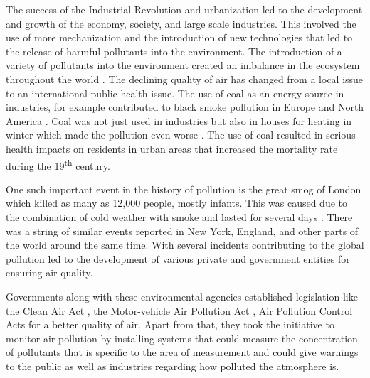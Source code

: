  The success of the Industrial Revolution and urbanization led to the development and growth of the economy, society, and large scale industries. This involved the use of more mechanization and the introduction of new technologies that led to the release of harmful pollutants into the environment. The introduction of a variety of pollutants into the environment created an imbalance in the ecosystem throughout the world \cite{manisalidis2020environmental}. The declining quality of air has changed from a local issue to an international public health issue. The use of coal as an energy source in industries, for example contributed to black smoke pollution in Europe and North America \cite{heidorn1978chronology}. Coal was not just used in industries but also in houses for heating in winter which made the pollution even worse \cite{Al2016}. The use of coal resulted in serious health impacts on residents in urban areas that increased the mortality rate during the 19\textsuperscript{th} century. 
 \par
 One such important event in the history of pollution is the great smog of London which killed as many as 12,000 people, mostly infants. This was caused due to the combination of cold weather with smoke and lasted for several days \cite{wilkins1954air}. There was a string of similar events reported in New York, England, and other parts of the world around the same time. With several incidents contributing to the global pollution led to the development of various private and government entities for ensuring air quality. 
 
 Governments along with these environmental agencies established legislation like the Clean Air Act \cite{caa}, the Motor-vehicle Air Pollution Act \cite{portney1990air}, Air Pollution Control Acts \cite{apc} for a better quality of air. Apart from that, they took the initiative to monitor air pollution by installing systems that could measure the concentration of pollutants that is specific to the area of measurement and could give warnings to the public as well as industries regarding how polluted the atmosphere is.
 
